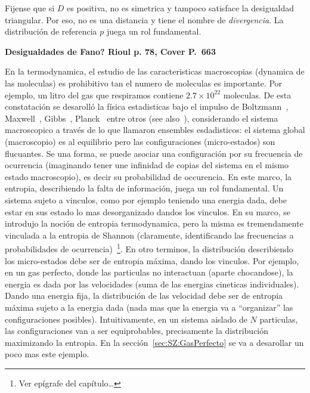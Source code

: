 Fijense  que  si  $D$ es  positiva,  no  es  simetrica  y tampoco  satisface  la
desigualdad triangular. Por  eso, no es una distancia y tiene  el nombre de {\it
  divergencia}. La distribuci\'on de referencia $p$ juega un rol fundamental.



\label{s:SZ:Desigualdades}


{\bf\color{red} Desigualdades de Fano? Rioul p. 78, Cover P.~663}


\label{sec:SZ:MaxEnt}

En la termodynamica, el estudio de las caracteristicas macroscopias (dynamica de
las  moleculas) es prohibitivo  tan el  numero de  moleculas es  importante. Por
ejemplo,  un  litro  del  gas  que  respiramos  contiene  $2.7  \times  10^{22}$
moleculas. De  esta constataci\'on se desaroll\'o la  f\'isica estadisticas bajo
el    impulso    de    Boltzmann~\cite{Bol96,   Bol98},    Maxwell~\cite{Max67},
Gibbs~\cite{Gib02},  Planck~\cite{Pla15}  entre  otros (see  also~\cite{Jay65}),
considerando el  sistema macroscopico  a trav\'es de  lo que  llamaron ensembles
esdadisticos:  el  sistema  global  (macroscopio)  es  al  equilibrio  pero  las
configuraciones (micro-estados)  son flucuantes. Se una forma,  se puede asociar
una  configuraci\'on  por su  frecuencia  de  ocurrencia  (imaginando tener  une
infinidad de  copias del sistema  en el mismo  estado macroscopio), es  decir su
probabilidad de occurencia.   En este marco, la entropia,  describiendo la falta
de informaci\'on, juega un rol  fundamental.  Un sistema sujeto a vinculos, como
por  ejemplo  teniendo  una energia  dada,  debe  estar  en  sus estado  lo  mas
desorganizado dandos  los vinculos.   En su marco,  se introdujo la  noci\'on de
entropia termodynamica, pero  la misma es tremendamente vinculada  a la entropia
de  Shannon  (claramente,  identificando  las frecuencias  a  probabilidades  de
ocurrencia)~\footnote{Ver ep\'igrafe  del cap\'itulo\ldots}.  En  otro terminos,
la distribuci\'on describiendo los  micro-estados debe ser de entropia m\'axima,
dando los  vinculos. Por ejemplo,  en un gas  perfecto, donde las  particulas no
interactuan (aparte chocandose), la energia es dada por las velocidades (suma de
las energias cineticas individuales).  Dando una energia fija, la distribuci\'on
de las  velocidad debe ser de entropia  m\'axima sujeto a la  energia dada (nada
mas  que   la  energia  va   a  ``organizar''  las   configuraciones  posibles).
Intuitivamente, en un sistema aislado de $N$ particulas, las configuraciones van
a ser equiprobables, precisamente la distribuci\'on maximizando la entropia.  En
la  secci\'on~\ref{sec:SZ:GasPerfecto}  se va  a  desarollar  un  poco mas  este
ejemplo.

